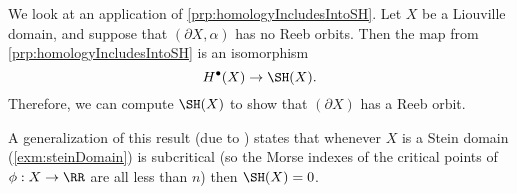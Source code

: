 
\begin{application}
\label{app:weinsteinConjecture}
We look at an application of \cref{prp:homologyIncludesIntoSH}. 
Let $X$ be a Liouville domain, and suppose that $(\partial X, \alpha)$ has no Reeb orbits. Then the map from \cref{prp:homologyIncludesIntoSH} is an isomorphism 
\[H^\bullet(X)\to \SH(X).\]
Therefore, we can compute $\SH(X)$ to show that $(\partial X)$ has a Reeb orbit.  



A generalization of this result (due to \cite{oancea2003suite}) states that whenever $X$ is a Stein domain (\cref{exm:steinDomain}) is subcritical (so the Morse indexes of the critical points of $\phi: X\to \RR$ are all less than $n$) then $\SH(X)=0$. 
\end{application}